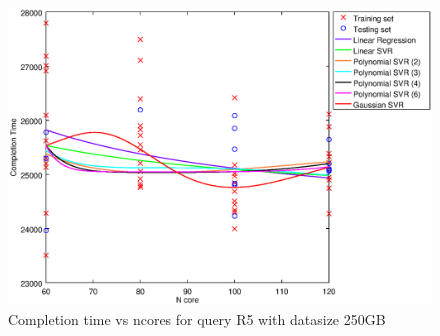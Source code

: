 
\begin {figure}[hbtp]
\centering
\includegraphics[width=\textwidth]{output/R5_250_ONLY_1_OVER_NCORES/plot_R5_250.eps}
\caption{Completion time vs ncores for query R5 with datasize 250GB}
\label{fig:all_nonlinear_R5_250}
\end {figure}
